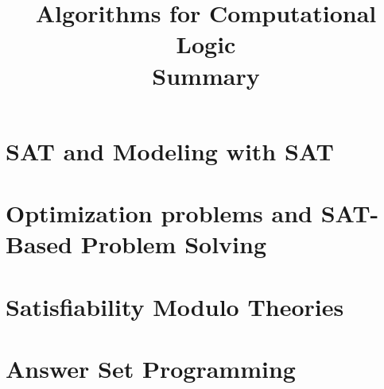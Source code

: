 \documentclass[10pt,a4paper]{report}
\title{\LARGE{Algorithms for Computational Logic} \\ \vspace{0.5cm} \normalsize{Summary}}
\date{}
\begin{document}
\maketitle
\tableofcontents

\chapter{SAT and Modeling with SAT}
\chapter{Optimization problems and SAT-Based Problem Solving}
\chapter{Satisfiability Modulo Theories}
\chapter{Answer Set Programming}
\end{document}
